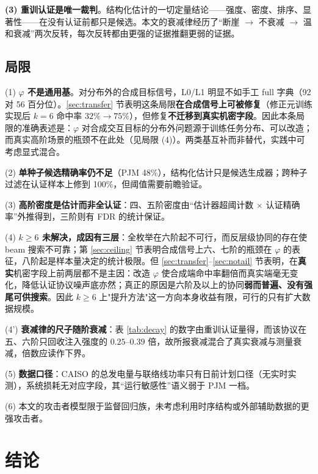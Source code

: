 \documentclass[10.5pt,compsoc,UTF8]{CjC}
\theoremstyle{mystyle}
\begin{document}
\textbf{(3) 重训认证是唯一裁判}。结构化估计的一切定量结论——强度、密度、排序、显著性——在没有认证前都只是候选。本文的衰减律经历了“断崖 $\to$ 不衰减 $\to$ 温和衰减”两次反转，每次反转都由更强的证据推翻更弱的证据。

\subsection{局限}
\label{sec:limit}

(1) \textbf{$\varphi$ 不是通用基}。对分布外的合成目标信号，L0/L1 明显不如手工 full 字典（92 对 56 百分位）。\ref{sec:transfer} 节表明这条局限\textbf{在合成信号上可被修复}（修正元训练实现后 $k=6$ 命中率 $32\%\to75\%$），但修复\textbf{不迁移到真实机密字段}。因此本条局限的准确表述是：$\varphi$ 对合成交互目标的分布外问题源于训练任务分布、可以改造；而真实高阶场景的瓶颈不在此处（见局限 (4)）。两类基互补而非替代，实践中可考虑显式混合。

(2) \textbf{单种子候选精确率仍不足}（PJM 48\%），结构化估计只是候选生成器；跨种子过滤在认证样本上修到 100\%，但阈值需要前瞻验证。

(3) \textbf{高阶密度是估计而非全认证}：四、五阶密度由“估计器超阈计数 $\times$ 认证精确率”外推得到，三阶则有 FDR 的统计保证。

(4) \textbf{$k\ge6$ 未解决，成因有三层}：全枚举在六阶起不可行，而反层级协同的存在使 beam 搜索不可靠；第 \ref{sec:ceiling} 节表明合成信号上六、七阶的瓶颈在 $\varphi$ 的表征，八阶起是样本量决定的统计极限。但 \ref{sec:transfer}--\ref{sec:notail} 节表明，在\textbf{真实}机密字段上前两层都不是主因：改造 $\varphi$ 使合成端命中率翻倍而真实端毫无变化，降低认证协议噪声底亦然；真正的原因是六阶及以上的协同\textbf{弱而普遍、没有强尾可供搜索}。因此 $k\ge6$ 上"提升方法"这一方向本身收益有限，可行的只有扩大数据规模。

(4') \textbf{衰减律的尺子随阶衰减}：表 \ref{tab:decay} 的数字由重训认证量得，而该协议在五、六阶只回收注入强度的 $0.25$--$0.39$ 倍，故所报衰减混合了真实衰减与测量衰减，倍数应读作下界。

(5) \textbf{数据口径}：CAISO 的总发电量与联络线功率只有日前计划口径（无实时实测），系统损耗无对应字段，其“运行敏感性”语义弱于 PJM 一档。

(6) 本文的攻击者模型限于监督回归族，未考虑利用时序结构或外部辅助数据的更强攻击者。

\section{\heiti 结论}
\end{document}
